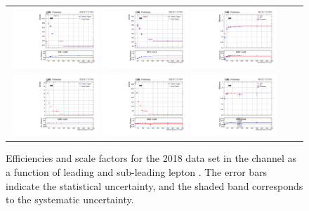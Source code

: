 {\begin{figure}[h]
  \begin{center}
    \begin{tabular}{ccc}
      \includegraphics[width=0.32\textwidth]{fig_2018_TrigSF/g_lepApt_ee_MC.pdf}
      \includegraphics[width=0.32\textwidth]{fig_2018_TrigSF/g_lepApt_ee_data.pdf}
      \includegraphics[width=0.32\textwidth]{fig_2018_TrigSF/g_ee_lepApt_FullSystUncBand.pdf}\\
      \includegraphics[width=0.32\textwidth]{fig_2018_TrigSF/g_lepBpt_ee_MC.pdf}
      \includegraphics[width=0.32\textwidth]{fig_2018_TrigSF/g_lepBpt_ee_data.pdf}
      \includegraphics[width=0.32\textwidth]{fig_2018_TrigSF/g_ee_lepBpt_FullSystUncBand.pdf}\\
    \end{tabular}
    \caption{Efficiencies and scale factors for the 2018 data set in the \ee channel as a function of leading and sub-leading lepton \pT.
            The error bars indicate the statistical uncertainty, and the shaded band corresponds to the systematic uncertainty.
            }
    \label{TrigSF_2018_2}
  \end{center}
\end{figure}

}
